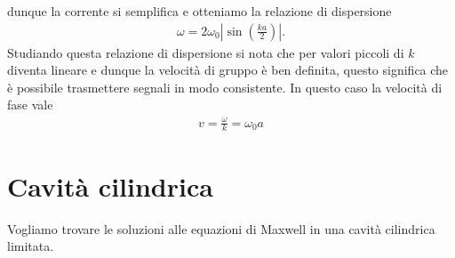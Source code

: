 dunque la corrente si semplifica e otteniamo la relazione di dispersione
\begin{align}
  \omega = 2\omega_0 \left|\sin \left( \frac{ka}{2} \right)\right|.
\end{align}
Studiando questa relazione di dispersione si nota che per valori piccoli di $ k $ diventa lineare e dunque la velocità di gruppo è ben definita, questo 
significa che è possibile trasmettere segnali in modo consistente. In questo caso la velocità di fase vale
\begin{align}
  v = \frac{\omega}{k} = \omega_0a
\end{align}

\section{Cavità cilindrica} \label{section:_esercizio_cavità_cilindrica}
Vogliamo trovare le soluzioni alle equazioni di Maxwell in una cavità cilindrica limitata. 


